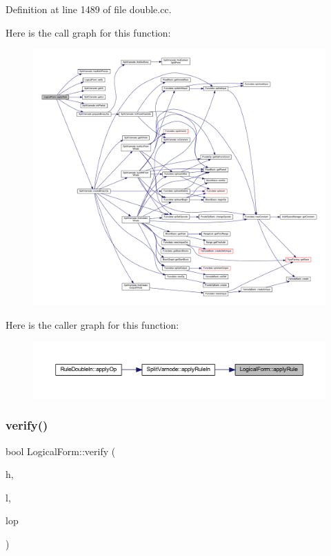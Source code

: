 Definition at line 1489 of file double.\+cc.

Here is the call graph for this function\+:
\nopagebreak
\begin{figure}[H]
\begin{center}
\leavevmode
\includegraphics[width=350pt]{class_logical_form_a1723130b5061eee9d95599b3dfb95463_cgraph}
\end{center}
\end{figure}
Here is the caller graph for this function\+:
\nopagebreak
\begin{figure}[H]
\begin{center}
\leavevmode
\includegraphics[width=350pt]{class_logical_form_a1723130b5061eee9d95599b3dfb95463_icgraph}
\end{center}
\end{figure}
\mbox{\label{class_logical_form_a1f37791de1ba99923bd526c18f945a2f}} 
\subsubsection{\texorpdfstring{verify()}{verify()}}
{\footnotesize\ttfamily bool Logical\+Form\+::verify (\begin{DoxyParamCaption}\item[{\mbox{\hyperlink{class_varnode}{Varnode}} $\ast$}]{h,  }\item[{\mbox{\hyperlink{class_varnode}{Varnode}} $\ast$}]{l,  }\item[{\mbox{\hyperlink{class_pcode_op}{Pcode\+Op}} $\ast$}]{lop }\end{DoxyParamCaption})}



